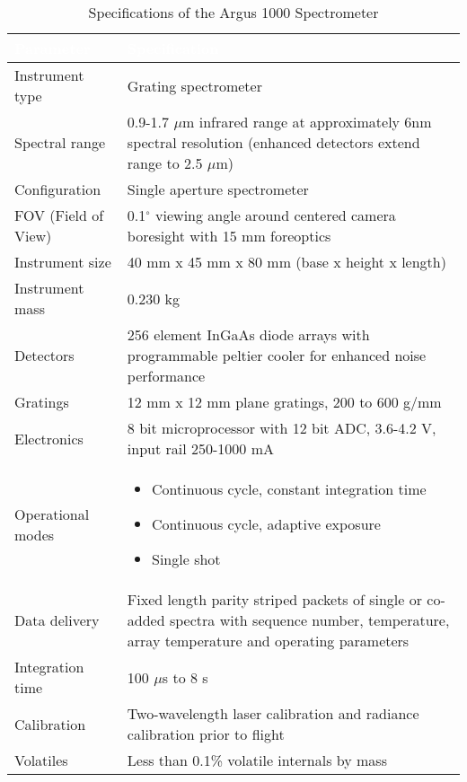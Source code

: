 \documentclass[nocover]            %
{CSLI}                       %
\begin{document}
\begin{table}[H]

\caption{Specifications of the Argus 1000 Spectrometer \cite{Toth}}

\begin{tabular}{|l|p{9.5cm}|}
\arrayrulecolor{white}
\hline
\rowcolor{gray!80}
\textcolor{white}{\textbf{Parameter}} & \textcolor{white}{\textbf{Specification}} \\ \hline
\rowcolor{gray!10}
Instrument type & Grating spectrometer \\ \hline
\rowcolor{gray!5}
Spectral range & 0.9-1.7 $\mu$m infrared range at approximately  6nm spectral resolution (enhanced detectors extend range to 2.5 $\mu$m) \\ \hline
\rowcolor{gray!10}
Configuration & Single aperture spectrometer \\ \hline
\rowcolor{gray!5}
FOV (Field of View) & 0.1$^\circ$ viewing angle around centered camera boresight with 15 mm foreoptics \\ \hline
\rowcolor{gray!10}
Instrument size & 40 mm x 45 mm x 80 mm (base x height x length)\\ \hline
\rowcolor{gray!5}
Instrument mass & 0.230 kg \\ \hline
\rowcolor{gray!10}
Detectors & 256 element InGaAs diode arrays with programmable peltier cooler for enhanced noise performance \\ \hline
\rowcolor{gray!5}
Gratings & 12 mm x 12 mm plane gratings, 200 to 600 g/mm\\ \hline
\rowcolor{gray!10}
Electronics & 8 bit microprocessor with 12 bit ADC, 3.6-4.2 V,  input rail 250-1000 mA\\ \hline
\rowcolor{gray!5}
Operational modes &
\vspace{-0.75cm} 
\begin{itemize}
\item Continuous cycle, constant integration time
\item Continuous cycle, adaptive exposure
\item Single shot
\vspace{-0.5cm} 
\end{itemize}
\\ \hline 
\rowcolor{gray!10}
Data delivery & Fixed length parity striped packets of single or co-added spectra with
sequence number, temperature, array temperature and operating parameters\\ \hline
\rowcolor{gray!5}
Integration time & 100 $\mu$s to 8 s \\ \hline
\rowcolor{gray!10}
Calibration & Two-wavelength laser calibration and radiance calibration prior to flight \\ \hline
\rowcolor{gray!5}
Volatiles & Less than 0.1\% volatile internals by mass \\ \hline
\end{tabular}
\end{table}
\newpage
\end{document}
